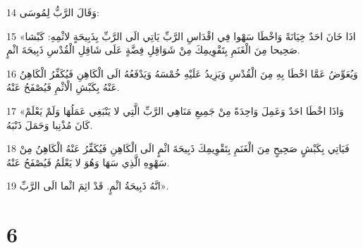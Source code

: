 \par 14 وَقَالَ الرَّبُّ لِمُوسَى:
\par 15 «اذَا خَانَ احَدٌ خِيَانَةً وَاخْطَا سَهْوا فِي اقْدَاسِ الرَّبِّ يَاتِي الَى الرَّبِّ بِذَبِيحَةٍ لاثْمِهِ: كَبْشا صَحِيحا مِنَ الْغَنَمِ بِتَقْوِيمِكَ مِنْ شَوَاقِلِ فِضَّةٍ عَلَى شَاقِلِ الْقُدْسِ ذَبِيحَةَ اثْمٍ.
\par 16 وَيُعَوِّضُ عَمَّا اخْطَا بِهِ مِنَ الْقُدْسِ وَيَزِيدُ عَلَيْهِ خُمْسَهُ وَيَدْفَعُهُ الَى الْكَاهِنِ فَيُكَفِّرُ الْكَاهِنُ عَنْهُ بِكَبْشِ الْاثْمِ فَيُصْفَحُ عَنْهُ.
\par 17 «وَاذَا اخْطَا احَدٌ وَعَمِلَ وَاحِدَةً مِنْ جَمِيعِ مَنَاهِي الرَّبِّ الَّتِي لا يَنْبَغِي عَمَلُهَا وَلَمْ يَعْلَمْ كَانَ مُذْنِبا وَحَمَلَ ذَنْبَهُ.
\par 18 فَيَاتِي بِكَبْشٍ صَحِيحٍ مِنَ الْغَنَمِ بِتَقْوِيمِكَ ذَبِيحَةَ اثْمٍ الَى الْكَاهِنِ فَيُكَفِّرُ عَنْهُ الْكَاهِنُ مِنْ سَهْوِهِ الَّذِي سَهَا وَهُوَ لا يَعْلَمُ فَيُصْفَحُ عَنْهُ.
\par 19 انَّهُ ذَبِيحَةُ اثْمٍ. قَدْ اثِمَ اثْما الَى الرَّبِّ».

\chapter{6}

